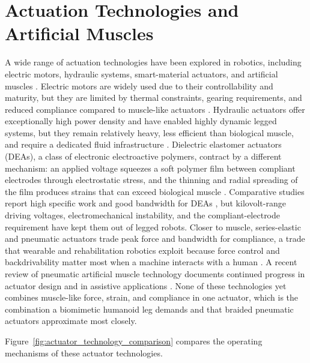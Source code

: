 \section{Actuation Technologies and Artificial Muscles}\label{sec:bg_actuation}

A wide range of actuation technologies have been explored in robotics, including electric motors, hydraulic systems, smart-material actuators, and artificial muscles \citep{he_mechanism_2020, liang_comparative_2020}. Electric motors are widely used due to their controllability and maturity, but they are limited by thermal constraints, gearing requirements, and reduced compliance compared to muscle-like actuators \citep{veale_towards_2016, suzumori_trends_2018}. Hydraulic actuators offer exceptionally high power density and have enabled highly dynamic legged systems, but they remain relatively heavy, less efficient than biological muscle, and require a dedicated fluid infrastructure \citep{suzumori_trends_2018}. Dielectric elastomer actuators (DEAs), a class of electronic electroactive polymers, contract by a different mechanism: an applied voltage squeezes a soft polymer film between compliant electrodes through electrostatic stress, and the thinning and radial spreading of the film produces strains that can exceed biological muscle \citep{madden_artificial_2004}. Comparative studies report high specific work and good bandwidth for DEAs \citep{liang_comparative_2020}, but kilovolt-range driving voltages, electromechanical instability, and the compliant-electrode requirement have kept them out of legged robots. Closer to muscle, series-elastic and pneumatic actuators trade peak force and bandwidth for compliance, a trade that wearable and rehabilitation robotics exploit because force control and backdrivability matter most when a machine interacts with a human \citep{aksoz_design_2019, leibach_development_2020, li_influence_2020}. A recent review of pneumatic artificial muscle technology documents continued progress in actuator design and in assistive applications \citep{zhagiparova_recent_2025}. None of these technologies yet combines muscle-like force, strain, and compliance in one actuator, which is the combination a biomimetic humanoid leg demands and that braided pneumatic actuators approximate most closely.

Figure~\ref{fig:actuator_technology_comparison} compares the operating mechanisms of these actuator technologies.

